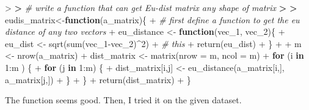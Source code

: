 \documentclass[
]{article}
\newenvironment{Shaded}{\begin{snugshade}}{\end{snugshade}}
\newcommand{\AttributeTok}[1]{\textcolor[rgb]{0.77,0.63,0.00}{#1}}
\newcommand{\CommentTok}[1]{\textcolor[rgb]{0.56,0.35,0.01}{\textit{#1}}}
\newcommand{\ControlFlowTok}[1]{\textcolor[rgb]{0.13,0.29,0.53}{\textbf{#1}}}
\newcommand{\DecValTok}[1]{\textcolor[rgb]{0.00,0.00,0.81}{#1}}
\newcommand{\ErrorTok}[1]{\textcolor[rgb]{0.64,0.00,0.00}{\textbf{#1}}}
\newcommand{\FunctionTok}[1]{\textcolor[rgb]{0.00,0.00,0.00}{#1}}
\newcommand{\NormalTok}[1]{#1}
\newcommand{\OtherTok}[1]{\textcolor[rgb]{0.56,0.35,0.01}{#1}}
\newcommand{\SpecialCharTok}[1]{\textcolor[rgb]{0.00,0.00,0.00}{#1}}
\begin{document}
\begin{Shaded}
\begin{Highlighting}[]
\SpecialCharTok{\textgreater{}} 
\ErrorTok{\textgreater{}} \CommentTok{\# write a function that can get Eu{-}dist matrix any shape of matrix}
\ErrorTok{\textgreater{}} 
\ErrorTok{\textgreater{}}\NormalTok{ eudis\_matrix}\OtherTok{\textless{}{-}}\ControlFlowTok{function}\NormalTok{(a\_matrix)\{}
\SpecialCharTok{+}   \CommentTok{\# first define a function to get the eu distance of any two vectors}
\SpecialCharTok{+}\NormalTok{   eu\_distance }\OtherTok{\textless{}{-}} \ControlFlowTok{function}\NormalTok{(vec\_1, vec\_2)\{}
\SpecialCharTok{+}\NormalTok{     eu\_dist }\OtherTok{\textless{}{-}} \FunctionTok{sqrt}\NormalTok{(}\FunctionTok{sum}\NormalTok{(vec\_1}\SpecialCharTok{{-}}\NormalTok{vec\_2)}\SpecialCharTok{\^{}}\DecValTok{2}\NormalTok{)}
\SpecialCharTok{+}     \CommentTok{\# this}
\SpecialCharTok{+}     \FunctionTok{return}\NormalTok{(eu\_dist)}
\SpecialCharTok{+}\NormalTok{     \}}
\SpecialCharTok{+}   
\SpecialCharTok{+}\NormalTok{   m }\OtherTok{\textless{}{-}} \FunctionTok{nrow}\NormalTok{(a\_matrix)}
\SpecialCharTok{+}\NormalTok{   dist\_matrix }\OtherTok{\textless{}{-}} \FunctionTok{matrix}\NormalTok{(}\AttributeTok{nrow =}\NormalTok{ m, }\AttributeTok{ncol =}\NormalTok{ m)}
\SpecialCharTok{+}   \ControlFlowTok{for}\NormalTok{ (i }\ControlFlowTok{in} \DecValTok{1}\SpecialCharTok{:}\NormalTok{m ) \{}
\SpecialCharTok{+}     \ControlFlowTok{for}\NormalTok{ (j }\ControlFlowTok{in} \DecValTok{1}\SpecialCharTok{:}\NormalTok{m) \{}
\SpecialCharTok{+}\NormalTok{       dist\_matrix[i,j] }\OtherTok{\textless{}{-}} \FunctionTok{eu\_distance}\NormalTok{(a\_matrix[i,], a\_matrix[j,])}
\SpecialCharTok{+}\NormalTok{     \}}
\SpecialCharTok{+}\NormalTok{   \}}
\SpecialCharTok{+}   \FunctionTok{return}\NormalTok{(dist\_matrix)}
\SpecialCharTok{+}\NormalTok{ \}}
\end{Highlighting}
\end{Shaded}

The function seems good. Then, I tried it on the given dataset.
\end{document}
